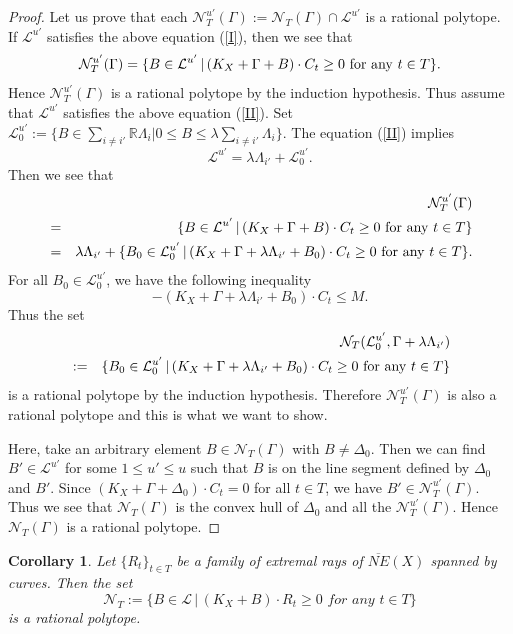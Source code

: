 \documentclass[12pt,twoside]{amsart}
\newtheorem{cor}[thm]{Corollary}
\theoremstyle{definition}
\begin{document}
\begin{proof}
Let us prove that each 
$\mathcal N_T^{u'}(\Gamma):=
\mathcal N_T(\Gamma)\cap \mathcal L^{u'}$ is 
a rational polytope. 
If $\mathcal L^{u'}$ satisfies the above equation (\ref{I}), 
then we see that 
$$\mathcal{N}_T^{u'}(\Gamma)=\{B\in\mathcal{L}^{u'}\,|\,
(K_X+\Gamma+B)\cdot C_t\geq 0 \,\,
{\rm for}\,\, {\rm any} \,\,t \in T\}.$$
Hence $\mathcal{N}_T^{u'}(\Gamma)$ is a rational polytope 
by the induction hypothesis. 
Thus assume that 
$\mathcal L^{u'}$ satisfies the above equation (\ref{II}). 
Set 
$\mathcal L^{u'}_0:=\{B\in \sum_{i\neq i'}\mathbb{R}\Lambda_i|
0\leq B\leq \lambda\sum_{i\neq i'}\Lambda_i\}.$
The equation (\ref{II}) implies 
$$\mathcal L^{u'}=\lambda\Lambda_{i'}+\mathcal L^{u'}_0.$$
Then we see that 
\begin{eqnarray*}
&&\mathcal{N}_T^{u'}(\Gamma)\\
&=&\{B\in\mathcal{L}^{u'}\,|\,
(K_X+\Gamma+B)\cdot C_t\geq 0 \,\,
{\rm for}\,\, {\rm any} \,\,t \in T\}\\
&=&\lambda\Lambda_{i'}+\{B_0\in\mathcal{L}^{u'}_0\,|\,
(K_X+\Gamma+\lambda\Lambda_{i'}+B_0)\cdot C_t\geq 0 \,\,
{\rm for}\,\, {\rm any} \,\,t \in T\}. 
\end{eqnarray*}
For all $B_0\in\mathcal{L}^{u'}_0$, 
we have the following inequality
$$-(K_X+\Gamma+\lambda\Lambda_{i'}+B_0)\cdot C_t\leq M.$$
Thus the set 
\begin{eqnarray*}
&&\mathcal{N}_T(\mathcal {L}^{u'}_0, \Gamma+\lambda\Lambda_{i'})\\
&:=&
\{B_0\in\mathcal{L}^{u'}_0\,|\,
(K_X+\Gamma+\lambda\Lambda_{i'}+B_0)\cdot C_t\geq 0 \,\,
{\rm for}\,\, {\rm any} \,\,t \in T\}
\end{eqnarray*}
is a rational polytope by the induction hypothesis. 
Therefore $\mathcal{N}_T^{u'}(\Gamma)$ 
is also a rational polytope and 
this is what we want to show. 

Here, take an arbitrary element 
$B\in \mathcal N_T(\Gamma)$ with $B\neq \Delta_{0}$. 
Then we can find $B'\in \mathcal L^{u'}$ for some $1\leq u'\leq u$ such that 
$B$ is on the line segment defined by $\Delta_0$ and $B'$. 
Since $(K_X+\Gamma+\Delta_0)\cdot C_t=0$ for all $t\in T$, 
we have $B'\in \mathcal N_T^{u'}(\Gamma)$. 
Thus we see that $\mathcal N_T(\Gamma)$ is the convex hull of 
$\Delta_0$ and all the $\mathcal N_T^{u'}(\Gamma)$. 
Hence $\mathcal N_T(\Gamma)$ is a rational polytope. 
\end{proof}

\begin{cor}\label{ratpolytopecor}
Let $\{R_t\}_{t\in T}$ be a family of extremal rays of 
$\overline{NE}(X)$ spanned by curves. 
Then the set 
$$\mathcal{N}_T:=\{B\in\mathcal{L}\,|\,
(K_X+B)\cdot R_t\geq 0 \,\,for\,\, any \,\,t \in T\}$$
is a rational polytope.
\end{cor}
\end{document}

